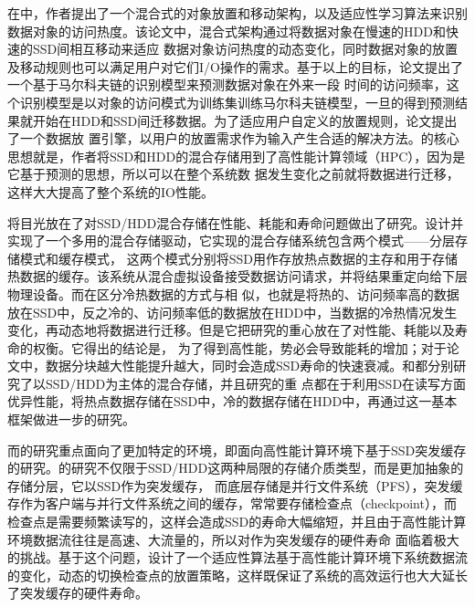 在中，作者提出了一个混合式的对象放置和移动架构，以及适应性学习算法来识别数据对象的访问热度。该论文中，混合式架构通过将数据对象在慢速的HDD和快速的SSD间相互移动来适应
数据对象访问热度的动态变化，同时数据对象的放置及移动规则也可以满足用户对它们I/O操作的需求。基于以上的目标，论文提出了一个基于马尔科夫链的识别模型来预测数据对象在外来一段
时间的访问频率，这个识别模型是以对象的访问模式为训练集训练马尔科夫链模型，一旦的得到预测结果就开始在HDD和SSD间迁移数据。为了适应用户自定义的放置规则，论文提出了一个数据放
置引擎，以用户的放置需求作为输入产生合适的解决方法。的核心思想就是，作者将SSD和HDD的混合存储用到了高性能计算领域（HPC），因为是它基于预测的思想，所以可以在整个系统数
据发生变化之前就将数据进行迁移，这样大大提高了整个系统的IO性能。

将目光放在了对SSD/HDD混合存储在性能、耗能和寿命问题做出了研究。设计并实现了一个多用的混合存储驱动，它实现的混合存储系统包含两个模式——分层存储模式和缓存模式，
这两个模式分别将SSD用作存放热点数据的主存和用于存储热数据的缓存。该系统从混合虚拟设备接受数据访问请求，并将结果重定向给下层物理设备。而在区分冷热数据的方式与相
似，也就是将热的、访问频率高的数据放在SSD中，反之冷的、访问频率低的数据放在HDD中，当数据的冷热情况发生变化，再动态地将数据进行迁移。但是它把研究的重心放在了对性能、耗能以及寿命的权衡。它得出的结论是，
为了得到高性能，势必会导致能耗的增加；对于论文中，数据分块越大性能提升越大，同时会造成SSD寿命的快速衰减。和都分别研究了以SSD/HDD为主体的混合存储，并且研究的重
点都在于利用SSD在读写方面优异性能，将热点数据存储在SSD中，冷的数据存储在HDD中，再通过这一基本框架做进一步的研究。

而的研究重点面向了更加特定的环境，即面向高性能计算环境下基于SSD突发缓存的研究。的研究不仅限于SSD/HDD这两种局限的存储介质类型，而是更加抽象的存储分层，它以SSD作为突发缓存，
而底层存储是并行文件系统（PFS），突发缓存作为客户端与并行文件系统之间的缓存，常常要存储检查点（checkpoint），而检查点是需要频繁读写的，这样会造成SSD的寿命大幅缩短，并且由于高性能计算环境数据流往往是高速、大流量的，所以对作为突发缓存的硬件寿命
面临着极大的挑战。基于这个问题，设计了一个适应性算法基于高性能计算环境下系统数据流的变化，动态的切换检查点的放置策略，这样既保证了系统的高效运行也大大延长了突发缓存的硬件寿命。

